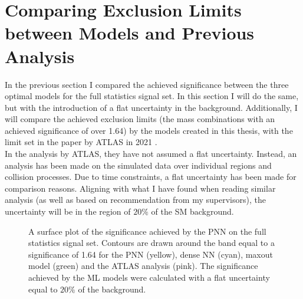 \section{Comparing Exclusion Limits between Models and Previous Analysis}
In the previous section I compared the achieved significance between 
the three optimal models for the full statistics signal set. In this section 
I will do the same, but with the introduction of a flat uncertainty in the background.
Additionally, I will compare the achieved exclusion limits (the mass combinations with an achieved 
significance of over 1.64) by the models created in this thesis, with the limit set in the paper by ATLAS 
in 2021 \cite{atlas_search_2021}.
\\
In the analysis by \ac{ATLAS}, they have not assumed a flat uncertainty. Instead, an analysis has been made on the simulated data 
over individual regions and collision processes. Due to time constraints, a flat uncertainty has been made for comparison 
reasons. Aligning with what I have found when reading similar analysis (as well as based on recommendation from my supervisors), 
the uncertainty will be in the region of $20\%$ of the \ac{SM} background.\\
\begin{figure}
    \caption[A surface plot of the significance comparing sensitivity limits set by \ac{PNN}, dense \ac{NN}, maxout model
    and the \ac{ATLAS} analysis, where the models have assumed a flat uncertainty of $20\%$.]{A surface plot of the significance achieved 
    by the \ac{PNN} on the full statistics signal set. Contours are drawn around the band equal to a significance of 1.64 for the \ac{PNN} 
    (yellow), dense \ac{NN} (cyan), maxout model (green) and the \ac{ATLAS} analysis (pink). The significance achieved by the \ac{ML} models were 
    calculated with a flat uncertainty equal to $20\%$ of the background.}
    \label{fig:compLimit20}
\end{figure}
